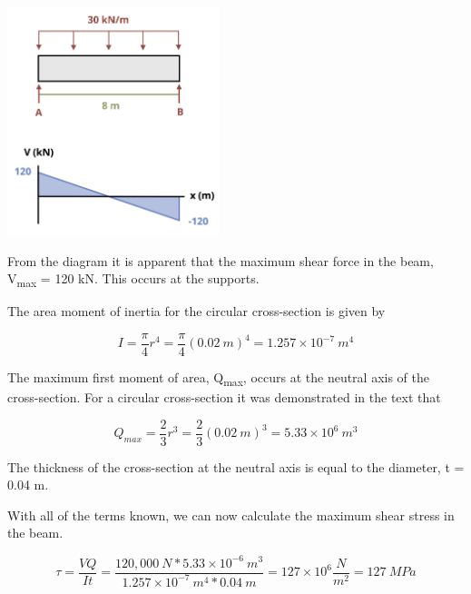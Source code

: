 \documentclass[
  letterpaper,
  DIV=11,
  numbers=noendperiod]{scrreprt}
\theoremstyle{definition}
\theoremstyle{remark}
\begin{document}
\begin{tcolorbox}
\begin{tcolorbox}
\begin{center}
\includegraphics[width=2.4375in,height=\textheight]{images/CH10 PNGs/example 10.3 part 2.png}
\end{center}

From the diagram it is apparent that the maximum shear force in the
beam, V\textsubscript{max} = 120 kN. This occurs at the supports.

The area moment of inertia for the circular cross-section is given by

\[
I=\frac{\pi}{4} r^4=\frac{\pi}{4}(0.02{~m})^4=1.257 \times 10^{-7}{~m}^4
\]

The maximum first moment of area, Q\textsubscript{max}, occurs at the
neutral axis of the cross-section. For a circular cross-section it was
demonstrated in the text that

\[
Q_{max}=\frac{2}{3}r^3=\frac{2}{3}(0.02{~m})^3=5.33\times10^6{~m}^3
\]

The thickness of the cross-section at the neutral axis is equal to the
diameter, t = 0.04 m.

With all of the terms known, we can now calculate the maximum shear
stress in the beam.

\[
\tau=\frac{V Q}{I t}=\frac{120,000{~N} * 5.33 \times 10^{-6}{~m}^3}{1.257 \times 10^{-7}{~m}^4 * 0.04{~m}}=127\times10^6\frac{N}{m^2}=127{~MPa}
\]

\end{tcolorbox}

\end{tcolorbox}
\end{document}
